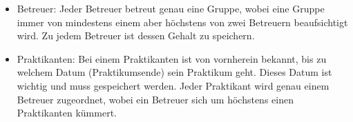         \begin{itemize}
          \item Betreuer: Jeder Betreuer betreut genau eine Gruppe, wobei eine Gruppe immer von mindestens einem aber h\"ochstens von zwei Betreuern beaufsichtigt wird. Zu jedem Betreuer ist dessen Gehalt zu speichern.

          \item Praktikanten: Bei einem Praktikanten ist von vornherein bekannt, bis zu welchem Datum (Praktikumsende) sein Praktikum geht. Dieses Datum ist wichtig und muss gespeichert werden. Jeder Praktikant wird genau einem Betreuer zugeordnet, wobei ein Betreuer sich um h\"ochstens einen Praktikanten k\"ummert.
        \end{itemize}
\clearpage
